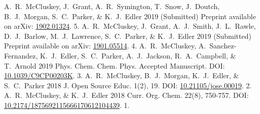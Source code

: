 \begin{cvpubys}
  \cvpuby
    {A.~R.~McCluskey, J.~Grant, A.~R.~Symington, T.~Snow, J.~Doutch, B.~J.~Morgan, S.~C.~Parker, \& K.~J.~Edler}
    {2019}
    {(Submitted)}
    {Preprint available on arXiv:}
    {\href{https://arxiv.org/abs/1902.01324}{1902.01324}.}
    {5.}
  \cvpuby
    {A.~R.~McCluskey, J.~Grant, A.~J.~Smith, J.~L.~Rawle, D.~J.~Barlow, M.~J.~Lawrence, S.~C.~Parker, \& K.~J.~Edler}
    {2019}
    {(Submitted)}
    {Preprint available on arXiv:}
    {\href{https://arxiv.org/abs/1901.05514}{1901.05514}.}
    {4.}
  \cvpuby
    {A.~R.~McCluskey, A.~Sanchez-Fernandez, K.~J.~Edler, S.~C.~Parker, A.~J.~Jackson, R.~A.~Campbell, \& T.~Arnold}
    {2019}
    {Phys. Chem. Chem. Phys.}
    {Accepted Manuscript.}
    {DOI: \href{https://doi.org/10.1039/C9CP00203K}{10.1039/C9CP00203K}.}
    {3.}
  \cvpuby
    {A.~R.~McCluskey, B.~J.~Morgan, K.~J.~Edler, \& S.~C.~Parker}
    {2018}
    {J. Open Source Educ.}
    {1(2), 19.}
    {DOI: \href{http://doi.org/10.21105/jose.00019}{10.21105/jose.00019}.}
    {2.}
  \cvpuby
    {A.~R.~McCluskey, \& K.~J.~Edler}
    {2018}
    {Curr. Org. Chem.}
    {22(8), 750-757.}
    {DOI: \href{http://doi.org/10.2174/1875692115666170612104439}{10.2174/1875692115666170612104439}.}
    {1.}
\end{cvpubys}
